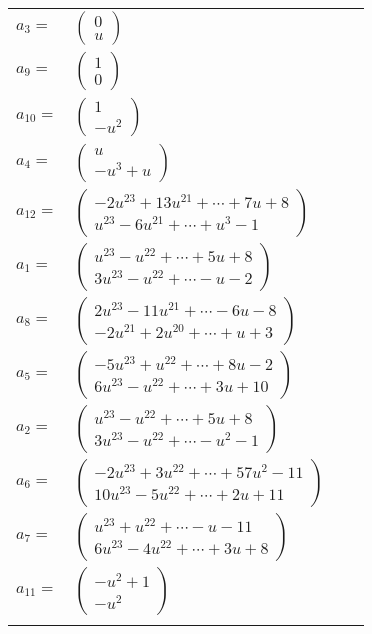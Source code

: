 \documentclass[1p]{elsarticle_modified}
\theoremstyle{definition}
\begin{document}
\begin{tabular}{m{7pt} m{180pt} m{7pt} m{180pt} }
\flushright $a_{3}=$&$\begin{pmatrix}0\\u\end{pmatrix}$ \\
\flushright $a_{9}=$&$\begin{pmatrix}1\\0\end{pmatrix}$ \\
\flushright $a_{10}=$&$\begin{pmatrix}1\\- u^2\end{pmatrix}$ \\
\flushright $a_{4}=$&$\begin{pmatrix}u\\- u^3+u\end{pmatrix}$ \\
\flushright $a_{12}=$&$\begin{pmatrix}-2 u^{23}+13 u^{21}+\cdots+7 u+8\\u^{23}-6 u^{21}+\cdots+u^3-1\end{pmatrix}$ \\
\flushright $a_{1}=$&$\begin{pmatrix}u^{23}- u^{22}+\cdots+5 u+8\\3 u^{23}- u^{22}+\cdots- u-2\end{pmatrix}$ \\
\flushright $a_{8}=$&$\begin{pmatrix}2 u^{23}-11 u^{21}+\cdots-6 u-8\\-2 u^{21}+2 u^{20}+\cdots+u+3\end{pmatrix}$ \\
\flushright $a_{5}=$&$\begin{pmatrix}-5 u^{23}+u^{22}+\cdots+8 u-2\\6 u^{23}- u^{22}+\cdots+3 u+10\end{pmatrix}$ \\
\flushright $a_{2}=$&$\begin{pmatrix}u^{23}- u^{22}+\cdots+5 u+8\\3 u^{23}- u^{22}+\cdots- u^2-1\end{pmatrix}$ \\
\flushright $a_{6}=$&$\begin{pmatrix}-2 u^{23}+3 u^{22}+\cdots+57 u^2-11\\10 u^{23}-5 u^{22}+\cdots+2 u+11\end{pmatrix}$ \\
\flushright $a_{7}=$&$\begin{pmatrix}u^{23}+u^{22}+\cdots- u-11\\6 u^{23}-4 u^{22}+\cdots+3 u+8\end{pmatrix}$ \\
\flushright $a_{11}=$&$\begin{pmatrix}- u^2+1\\- u^2\end{pmatrix}$\\&\end{tabular}
\end{document}
